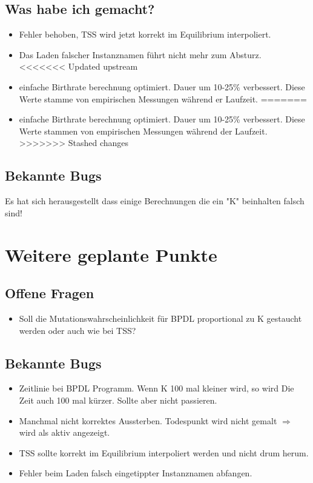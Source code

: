 \documentclass{article}
\begin{document}
\begin{itemize}
\subsection{Was habe ich gemacht?}
	\begin{itemize}
		\item Fehler behoben, TSS wird jetzt korrekt im Equilibrium interpoliert.
		\item Das Laden falscher Instanznamen führt nicht mehr zum Absturz.
<<<<<<< Updated upstream
		\item einfache Birthrate berechnung optimiert. Dauer um 10-25\% verbessert. Diese Werte stamme von empirischen Messungen während er Laufzeit.
=======
		\item einfache Birthrate berechnung optimiert. Dauer um 10-25\% verbessert. Diese Werte stammen von empirischen Messungen während der Laufzeit.
>>>>>>> Stashed changes
	\end{itemize}
\subsection{Bekannte Bugs}
	Es hat sich herausgestellt dass einige Berechnungen die ein "{}K"{} beinhalten falsch sind!\\
	

\section{Weitere geplante Punkte}
\subsection{Offene Fragen}
	\begin{itemize}
		\item Soll die Mutationswahrscheinlichkeit für BPDL proportional zu K gestaucht werden oder auch wie bei TSS?
	\end{itemize}
\subsection{Bekannte Bugs}
	\begin{itemize}
		\item Zeitlinie bei BPDL Programm. Wenn K 100 mal kleiner wird, so wird Die Zeit auch 100 mal kürzer. Sollte aber nicht passieren.
		\item Manchmal nicht korrektes Aussterben. Todespunkt wird nicht gemalt $ \Rightarrow $ wird als aktiv angezeigt.
		\item TSS sollte korrekt im Equilibrium interpoliert werden und nicht drum herum. \checkmark
		\item Fehler beim Laden falsch eingetippter Instanznamen abfangen. \checkmark		
	\end{itemize}
	

\end{itemize}
\end{document}
